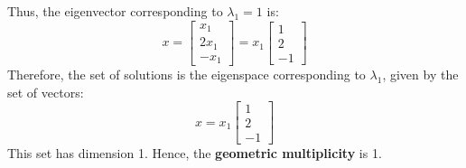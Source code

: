 \documentclass{article}
\begin{document}
Thus, the eigenvector corresponding to \( \lambda_1 = 1 \) is:
\[
x = \begin{bmatrix} x_1 \\ 2x_1 \\ -x_1 \end{bmatrix} = x_1 \begin{bmatrix} 1 \\ 2 \\ -1 \end{bmatrix}
\]
Therefore, the set of solutions is the eigenspace corresponding to \( \lambda_1 \), given by the set of vectors:
\[
x = x_1 \begin{bmatrix} 1 \\ 2 \\ -1 \end{bmatrix}
\]
This set has dimension 1. Hence, the \textbf{geometric multiplicity} is 1.
\end{document}
